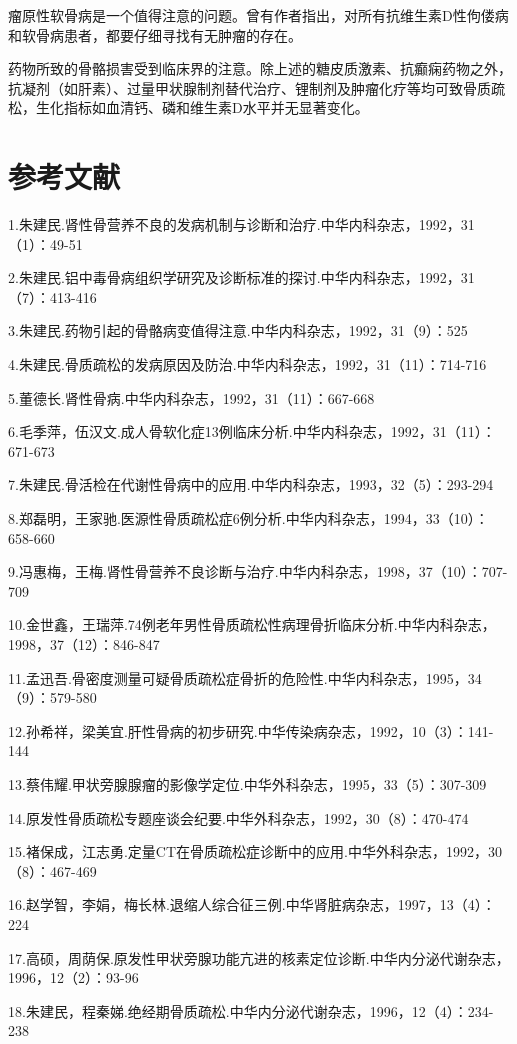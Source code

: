 瘤原性软骨病是一个值得注意的问题。曾有作者指出，对所有抗维生素D性佝偻病和软骨病患者，都要仔细寻找有无肿瘤的存在。

药物所致的骨骼损害受到临床界的注意。除上述的糖皮质激素、抗癫痫药物之外，抗凝剂（如肝素）、过量甲状腺制剂替代治疗、锂制剂及肿瘤化疗等均可致骨质疏松，生化指标如血清钙、磷和维生素D水平并无显著变化。

\protect\hypertarget{text00310.html}{}{}

\section{参考文献}

1.朱建民.肾性骨营养不良的发病机制与诊断和治疗.中华内科杂志，1992，31（1）：49-51

2.朱建民.铝中毒骨病组织学研究及诊断标准的探讨.中华内科杂志，1992，31（7）：413-416

3.朱建民.药物引起的骨骼病变值得注意.中华内科杂志，1992，31（9）：525

4.朱建民.骨质疏松的发病原因及防治.中华内科杂志，1992，31（11）：714-716

5.董德长.肾性骨病.中华内科杂志，1992，31（11）：667-668

6.毛季萍，伍汉文.成人骨软化症13例临床分析.中华内科杂志，1992，31（11）：671-673

7.朱建民.骨活检在代谢性骨病中的应用.中华内科杂志，1993，32（5）：293-294

8.郑磊明，王家驰.医源性骨质疏松症6例分析.中华内科杂志，1994，33（10）：658-660

9.冯惠梅，王梅.肾性骨营养不良诊断与治疗.中华内科杂志，1998，37（10）：707-709

10.金世鑫，王瑞萍.74例老年男性骨质疏松性病理骨折临床分析.中华内科杂志，1998，37（12）：846-847

11.孟迅吾.骨密度测量可疑骨质疏松症骨折的危险性.中华内科杂志，1995，34（9）：579-580

12.孙希祥，梁美宜.肝性骨病的初步研究.中华传染病杂志，1992，10（3）：141-144

13.蔡伟耀.甲状旁腺腺瘤的影像学定位.中华外科杂志，1995，33（5）：307-309

14.原发性骨质疏松专题座谈会纪要.中华外科杂志，1992，30（8）：470-474

15.褚保成，江志勇.定量CT在骨质疏松症诊断中的应用.中华外科杂志，1992，30（8）：467-469

16.赵学智，李娟，梅长林.退缩人综合征三例.中华肾脏病杂志，1997，13（4）：224

17.高硕，周荫保.原发性甲状旁腺功能亢进的核素定位诊断.中华内分泌代谢杂志，1996，12（2）：93-96

18.朱建民，程秦娣.绝经期骨质疏松.中华内分泌代谢杂志，1996，12（4）：234-238

\protect\hypertarget{text00311.html}{}{}

